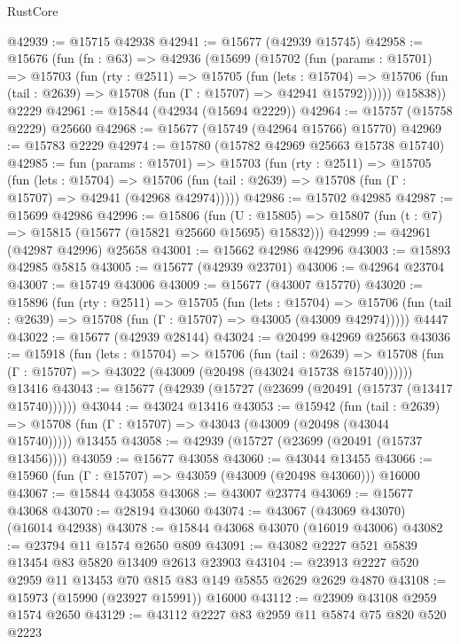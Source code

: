 \begin{lexlean}{RustCore}
\begin{coremodule}
@42939 := @15715 @42938
@42941 := @15677 (@42939 @15745)
@42958 := @15676
    (fun (fn : @63) =>
    @42936
      (@15699
        (@15702
          (fun (params : @15701) =>
          @15703
            (fun (rty : @2511) =>
            @15705
              (fun (lets : @15704) =>
              @15706 (fun (tail : @2639) => @15708 (fun (Γ : @15707) => @42941 @15792))))))
        @15838))
    @2229
@42961 := @15844 (@42934 (@15694 @2229))
@42964 := @15757 (@15758 @2229) @25660
@42968 := @15677 (@15749 (@42964 @15766) @15770)
@42969 := @15783 @2229
@42974 := @15780 (@15782 @42969 @25663 @15738 @15740)
@42985 := fun (params : @15701) =>
  @15703
    (fun (rty : @2511) =>
    @15705
      (fun (lets : @15704) =>
      @15706 (fun (tail : @2639) => @15708 (fun (Γ : @15707) => @42941 (@42968 @42974)))))
@42986 := @15702 @42985
@42987 := @15699 @42986
@42996 := @15806
    (fun (U : @15805) => @15807 (fun (t : @7) => @15815 (@15677 (@15821 @25660 @15695) @15832)))
@42999 := @42961 (@42987 @42996) @25658
@43001 := @15662 @42986 @42996
@43003 := @15893 @42985 @5815
@43005 := @15677 (@42939 @23701)
@43006 := @42964 @23704
@43007 := @15749 @43006
@43009 := @15677 (@43007 @15770)
@43020 := @15896
    (fun (rty : @2511) =>
    @15705
      (fun (lets : @15704) =>
      @15706 (fun (tail : @2639) => @15708 (fun (Γ : @15707) => @43005 (@43009 @42974)))))
    @4447
@43022 := @15677 (@42939 @28144)
@43024 := @20499 @42969 @25663
@43036 := @15918
    (fun (lets : @15704) =>
    @15706
      (fun (tail : @2639) =>
      @15708 (fun (Γ : @15707) => @43022 (@43009 (@20498 (@43024 @15738 @15740))))))
    @13416
@43043 := @15677 (@42939 (@15727 (@23699 (@20491 (@15737 (@13417 @15740))))))
@43044 := @43024 @13416
@43053 := @15942
    (fun (tail : @2639) => @15708 (fun (Γ : @15707) => @43043 (@43009 (@20498 (@43044 @15740)))))
    @13455
@43058 := @42939 (@15727 (@23699 (@20491 (@15737 @13456))))
@43059 := @15677 @43058
@43060 := @43044 @13455
@43066 := @15960 (fun (Γ : @15707) => @43059 (@43009 (@20498 @43060))) @16000
@43067 := @15844 @43058
@43068 := @43007 @23774
@43069 := @15677 @43068
@43070 := @28194 @43060
@43074 := @43067 (@43069 @43070) (@16014 @42938)
@43078 := @15844 @43068 @43070 (@16019 @43006)
@43082 := @23794 @11 @1574 @2650 @809
@43091 := @43082 @2227 @521 @5839 @13454 @83 @5820 @13409 @2613 @23903
@43104 := @23913 @2227 @520 @2959 @11 @13453 @70 @815 @83 @149 @5855 @2629 @2629 @4870
@43108 := @15973 (@15990 (@23927 @15991)) @16000
@43112 := @23909 @43108 @2959 @1574 @2650
@43129 := @43112
    @2227
    @83
    @2959
    @11
    @5874
    @75
    @820
    @520
    @2223

\end{coremodule}
\end{lexlean}
